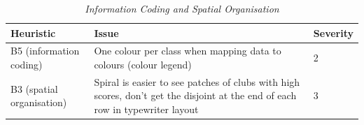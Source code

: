 \begin{table}[!htb]
\centering
\caption{\textit{Information Coding and Spatial Organisation}}
\begin{tabular}{|p{4cm}|p{8cm}|x{2cm}|} \hline
\textbf{Heuristic}&\textbf{Issue}&\textbf{Severity}\\ \hline
B5 (information coding)& One colour per class when mapping data to colours (colour legend) & 2 \\ \hline
B3 (spatial organisation)& Spiral is easier to see patches of clubs with high scores, don't get the disjoint at the end of each row in typewriter layout & 3 \\
\hline\end{tabular}
\label{table:informationcoding}
\end{table}


